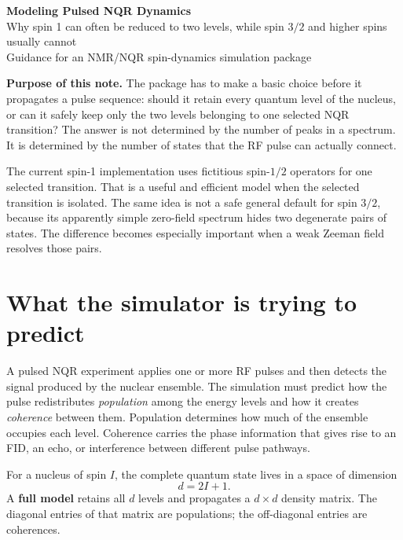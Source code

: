 \documentclass[11pt,letterpaper]{article}
\begin{document}
\begin{center}
{\LARGE\bfseries\color{navy}Modeling Pulsed NQR Dynamics}\\[4pt]
{\Large\color{teal}Why spin 1 can often be reduced to two levels, while spin $3/2$ and higher spins usually cannot}\\[8pt]
{\small Guidance for an NMR/NQR spin-dynamics simulation package}
\end{center}
\vspace{3pt}

\begin{openingbox}
\textbf{Purpose of this note.}
The package has to make a basic choice before it propagates a pulse sequence: should it retain every quantum level of the nucleus, or can it safely keep only the two levels belonging to one selected NQR transition? The answer is not determined by the number of peaks in a spectrum. It is determined by the number of states that the RF pulse can actually connect.

The current spin-1 implementation uses fictitious spin-$1/2$ operators for one selected transition. That is a useful and efficient model when the selected transition is isolated. The same idea is not a safe general default for spin $3/2$, because its apparently simple zero-field spectrum hides two degenerate pairs of states. The difference becomes especially important when a weak Zeeman field resolves those pairs.
\end{openingbox}

\section{What the simulator is trying to predict}

A pulsed NQR experiment applies one or more RF pulses and then detects the signal produced by the nuclear ensemble. The simulation must predict how the pulse redistributes \emph{population} among the energy levels and how it creates \emph{coherence} between them. Population determines how much of the ensemble occupies each level. Coherence carries the phase information that gives rise to an FID, an echo, or interference between different pulse pathways.

For a nucleus of spin $I$, the complete quantum state lives in a space of dimension
\begin{equation}
 d=2I+1.
\end{equation}
A \textbf{full model} retains all $d$ levels and propagates a $d\times d$ density matrix. The diagonal entries of that matrix are populations; the off-diagonal entries are coherences.
\end{document}
